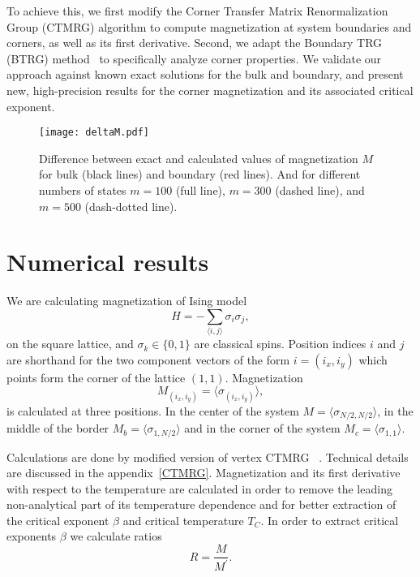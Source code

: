 \documentclass[showpacs,amssymb,twocolumn,floatfix,aps,pre,notitlepage]{revtex4-2}
\begin{document}
To achieve this, we first modify the Corner Transfer Matrix Renormalization Group (CTMRG) algorithm to compute magnetization at system boundaries and corners, as well as its first derivative. Second, we adapt the Boundary TRG (BTRG) method~\cite{iino2019} to specifically analyze corner properties. We validate our approach against known exact solutions for the bulk and boundary, and present new, high-precision results for the corner magnetization and its associated critical exponent.

\begin{figure}[h!]
\begin{center}
\texttt{[image: deltaM.pdf]}
\caption{Difference between exact and calculated values of magnetization $M$ for bulk (black lines) and boundary (red lines). And for different numbers of states $m = 100$ (full line), $m = 300$ (dashed line), and $m = 500$ (dash-dotted line).}
\label{fig:delM}
\end{center}
\end{figure}

\section{Numerical results}

We are calculating magnetization of Ising model
\begin{equation}
H = -\sum_{\langle i,j\rangle} \sigma_i\sigma_j,
\end{equation}
on the square lattice, and $\sigma_k \in \{0,1\}$ are classical spins. Position indices $i$ and $j$ are shorthand for the two component vectors of the form $i=(i_x,i_y)$ which points form the corner of the lattice $(1,1)$. Magnetization  
\begin{equation}
M_{(i_x,i_y)} = \langle \sigma_{(i_x,i_y)}\rangle,
\end{equation}
is calculated at three positions. In the center of the system $M = \langle\sigma_{N/2,N/2}\rangle$, in the middle of the border $M_b = \langle\sigma_{1,N/2}\rangle$ and in the corner of the system $M_c = \langle\sigma_{1,1}\rangle$.

Calculations are done by modified version of vertex CTMRG ~\cite{vertexctmrg1,vertexctmrg2}. Technical details are discussed in the appendix~\ref{CTMRG}. Magnetization and its first derivative with respect to the temperature are calculated in order to remove the leading non-analytical part of its temperature dependence and for better extraction of the critical exponent $\beta$ and critical temperature $T_C$. In order to extract critical exponents $\beta$ we calculate ratios
\begin{equation}
R = \frac{M}{M^{\prime}}.
\end{equation}
\end{document}
